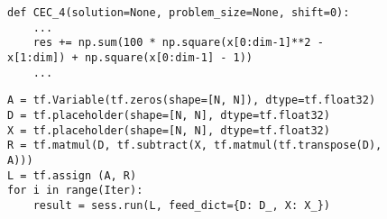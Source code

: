 \begin{figure}[t]
\begin{lstlisting}[caption={Optimized  Metaheuritics code for Listing~\ref{lst:motivated1}, with appropriate native library API.},label=lst:motivated2]
def CEC_4(solution=None, problem_size=None, shift=0):
    ...
    res += np.sum(100 * np.square(x[0:dim-1]**2 -  x[1:dim]) + np.square(x[0:dim-1] - 1))
    ...
\end{lstlisting}
\end{figure}


\begin{figure}[t]
\begin{lstlisting}[caption={Interaction inefficiencies in Deep Dictionary Learning~\cite{mahdizadehaghdam2019deep} due to loop-invariant computation.},label=lst:loop2]
A = tf.Variable(tf.zeros(shape=[N, N]), dtype=tf.float32)
D = tf.placeholder(shape=[N, N], dtype=tf.float32)
X = tf.placeholder(shape=[N, N], dtype=tf.float32)
R = tf.matmul(D, tf.subtract(X, tf.matmul(tf.transpose(D), A)))
L = tf.assign (A, R)
for i in range(Iter):
    result = sess.run(L, feed_dict={D: D_, X: X_})
\end{lstlisting}
\end{figure}

